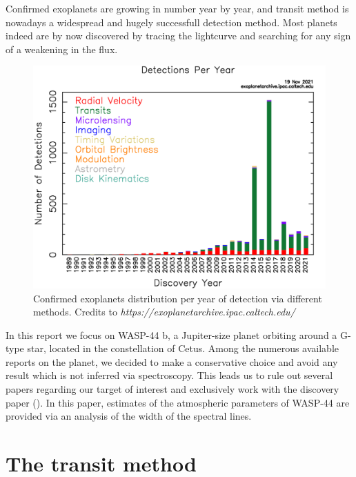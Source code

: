 \documentclass[a4paper,11pt,twocolumn]{article}
\begin{document}
Confirmed exoplanets are growing in number year by year, and transit method 
is nowadays a widespread and hugely successfull detection method. Most planets indeed are by now discovered 
by tracing the lightcurve and searching for any sign of a weakening in the 
flux.
\begin{figure}[H]
    \centering  
    \includegraphics[scale=0.15, angle=0]{../pictures/exo_dischist.png}
    \caption{Confirmed exoplanets distribution per year of detection via different methods. Credits to \textit{https://exoplanetarchive.ipac.caltech.edu/}}
\end{figure}
In this report we focus on WASP-44 b, a Jupiter-size planet orbiting around 
a G-type star, located in the constellation of Cetus.
Among the numerous available reports on the planet, we decided to make a 
conservative choice and avoid any result which is not inferred via 
spectroscopy. This leads us to rule out several papers regarding our target of interest and exclusively
 work with the discovery paper (\cite{Anderson}). In this paper, estimates 
of the atmospheric parameters of WASP-44 are provided via an analysis of 
the width of the spectral lines.





\section{The transit method }
\end{document}
